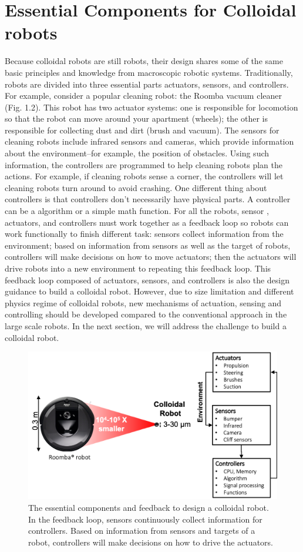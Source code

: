 \section{Essential Components for Colloidal robots}
Because colloidal robots are still robots, their design shares some of the same basic principles and knowledge from  macroscopic robotic systems.  Traditionally, robots are divided into three essential parts actuators, sensors, and controllers. For example, consider a popular cleaning robot: the Roomba vacuum cleaner (Fig. 1.2).  This robot has two actuator systems: one is responsible for locomotion so that the robot can move around your apartment (wheels); the other is responsible for collecting dust and dirt (brush and vacuum).
The sensors for cleaning robots include infrared  sensors and cameras, which provide information about the environment--for example, the position of obstacles. Using such information, the controllers are programmed  to help cleaning robots plan  the actions. For example, if cleaning robots sense a corner, the controllers will let cleaning robots turn around to avoid crashing. One different thing about controllers is that controllers don't necessarily have physical parts. A controller can be a algorithm or a simple math function.  For all the robots, sensor , actuators, and controllers must work together as a feedback loop so robots can work functionally to finish different task: sensors collect information from the environment; based on information from sensors as well as the target of robots,  controllers will make decisions  on how to move actuators; then the actuators will drive robots into a new environment to repeating this feedback loop. This feedback loop composed of actuators, sensors,  and controllers is also the design guidance to build a colloidal robot. However, due to size limitation and different physics regime of colloidal robots, new mechanisms of actuation, sensing and controlling should be developed compared to the conventional approach in the large scale robots.  In the next section, we will address the challenge to build a colloidal robot. 

\begin{figure}
\centering
\includegraphics[width=12cm]{figures/1_2.png}
\caption{The essential components and feedback to design a colloidal robot. In the feedback loop, sensors continuously collect information for controllers. Based on  information from sensors and targets of a robot, controllers will make decisions on how to drive the actuators.}
\label{fig:1.2}
\end{figure}

